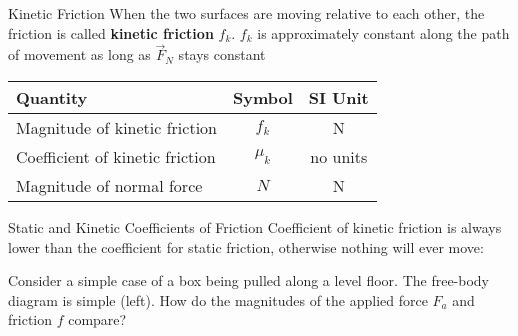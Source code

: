 \documentclass[12pt,compress,aspectratio=169]{beamer}
\begin{document}
\begin{frame}{Kinetic Friction}
  When the two surfaces are moving relative to each other, the friction is
  called \textbf{kinetic friction} $f_k$. $f_k$ is approximately constant along
  the path of movement as long  as $\vec F_N$ stays constant

  \begin{center}
    \begin{tabular}{l|c|c}
      \rowcolor{pink}
      \textbf{Quantity} & \textbf{Symbol} & \textbf{SI Unit} \\ \hline
      Magnitude of kinetic friction & $f_k$ & \si\newton \\
      Coefficient of kinetic friction & $\mu_k$ & no units \\
      Magnitude of normal force & $N$ & \si\newton
    \end{tabular}
  \end{center}
\end{frame}



\begin{frame}{Static and Kinetic Coefficients of Friction}    
  Coefficient of kinetic friction is always lower than the coefficient for
  static friction, otherwise nothing will ever move:
    

  \vspace{-.2in}Consider a simple case of a box being pulled along a level
  floor. The free-body diagram is simple (left). How do the magnitudes of the
  applied force $F_a$ and friction $f$ compare?

  \begin{columns}
    \centering

    \centering
  \end{columns}
\end{frame}
\end{document}
